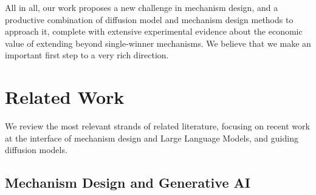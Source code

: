 \documentclass[format=acmsmall, review=false]{acmart}
\begin{document}
 \medskip All in all, our work proposes a new challenge in mechanism design, and a productive combination of diffusion model and mechanism design methods to approach it, complete with extensive experimental evidence about the economic value of extending beyond single-winner mechanisms. We believe that we make an important first step to a very rich direction.



\section{Related Work}

We review the most relevant strands of related literature, focusing on recent work at the interface of mechanism design and Large Language Models, and guiding diffusion models. 


\subsection{Mechanism Design and Generative AI}
\end{document}

